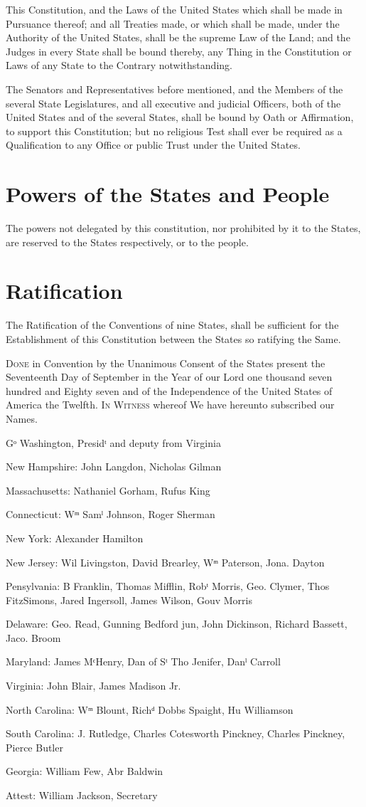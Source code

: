 \documentclass{constitution}
\begin{document}
This Constitution, and the Laws of the United States which shall be made in Pursuance thereof;
and all Treaties made, or which shall be made, under the Authority of the United States,
shall be the supreme Law of the Land;
and the Judges in every State shall be bound thereby,
any Thing in the Constitution or Laws of any State to the Contrary notwithstanding.

The Senators and Representatives before mentioned,
and the Members of the several State Legislatures,
and all executive and judicial Officers, both of the United States and of the several States,
shall be bound by Oath or Affirmation, to support this Constitution;
but no religious Test shall ever be required as a Qualification to any Office or public Trust under the United States.

\chapter{Powers of the States and People}
The powers not delegated by this constitution,
nor prohibited by it to the States,
are reserved to the States respectively,
or to the people.

\chapter{Ratification}
The Ratification of the Conventions of nine States,
shall be sufficient for the Establishment of this Constitution
between the States so ratifying the Same.

\textsc{Done} in Convention by the Unanimous Consent of the States present
the Seventeenth Day of September
in the Year of our Lord one thousand seven hundred and Eighty seven
and of the Independence of the United States of America the Twelfth.
\textsc{In Witness} whereof We have hereunto subscribed our Names.

Gᵒ Washington, Presidᵗ and deputy from Virginia

New Hampshire:		John Langdon, Nicholas Gilman

Massachusetts:		Nathaniel Gorham, Rufus King

Connecticut:		Wᵐ Samˡ Johnson, Roger Sherman

New York:		Alexander Hamilton

New Jersey:		Wil Livingston, David Brearley, Wᵐ Paterson, Jona. Dayton

Pensylvania:		B Franklin, Thomas Mifflin, Robᵗ Morris, Geo. Clymer, Thos FitzSimons,
			Jared Ingersoll, James Wilson, Gouv Morris

Delaware:		Geo. Read, Gunning Bedford jun, John Dickinson, Richard Bassett, Jaco. Broom

Maryland:		James MᶜHenry, Dan of Sᵗ Tho Jenifer, Danˡ Carroll

Virginia:		John Blair, James Madison Jr.

North Carolina:	Wᵐ Blount, Richᵈ Dobbs Spaight, Hu Williamson

South Carolina:	J. Rutledge, Charles Cotesworth Pinckney, Charles Pinckney, Pierce Butler

Georgia:		William Few, Abr Baldwin

Attest: William Jackson, Secretary
\end{document}
